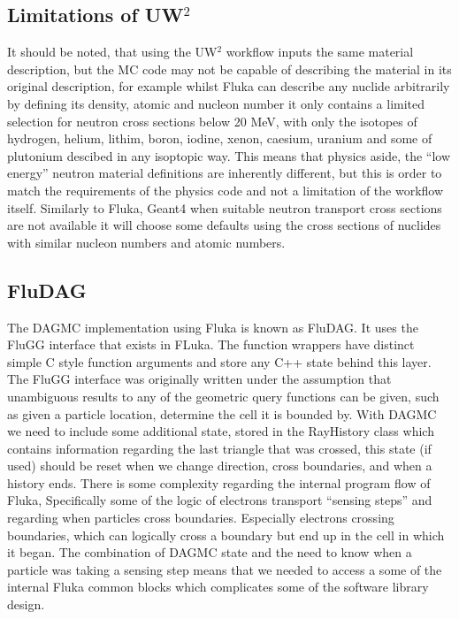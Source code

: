 \subsection{Limitations of UW$^2$}
It should be noted, that using the UW$^2$ workflow inputs the same material description, but the MC 
code may not be capable of describing the material in its original description, for example whilst
Fluka can describe any nuclide arbitrarily by defining its density, atomic and nucleon number it only
contains a limited selection for neutron cross sections below 20 MeV, with only the isotopes of 
hydrogen, helium, lithim, boron, iodine, xenon, caesium, uranium and some of plutonium descibed in
any isoptopic way. This means that physics aside, the ``low energy'' neutron material definitions are
inherently different, but this is order to match the requirements of the physics code and not a limitation 
of the workflow itself. Similarly to Fluka, Geant4 when suitable neutron transport cross sections are not 
available it will choose some defaults using the cross sections of nuclides with similar nucleon numbers
and atomic numbers.

\subsection{FluDAG}
The DAGMC implementation using Fluka is known as FluDAG. It uses the FluGG interface that exists
in FLuka. The function wrappers have distinct simple C style function arguments and store any 
C++ state behind this layer. The FluGG interface was originally written under the assumption
that unambiguous results to any of the geometric query functions can be given, such as 
given a particle location, determine the cell it is bounded by. With DAGMC we need to include some
additional state, stored in the RayHistory class which contains information regarding the last triangle
that was crossed, this state (if used) should be reset when we change direction, cross boundaries, and
when a history ends. There is some complexity regarding the internal program flow of Fluka, Specifically
some of the logic of electrons transport ``sensing steps'' and regarding when particles cross boundaries. 
Especially electrons crossing boundaries, which can logically cross a boundary but end up in the cell in 
which it began. The combination of DAGMC state and the need to know when a particle was taking a sensing step 
means that we needed to access a some of the internal Fluka common blocks which complicates some of the
software library design.

